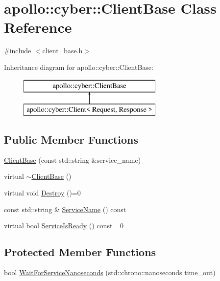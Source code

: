 \hypertarget{classapollo_1_1cyber_1_1ClientBase}{\section{apollo\-:\-:cyber\-:\-:Client\-Base Class Reference}
\label{classapollo_1_1cyber_1_1ClientBase}
}


{\ttfamily \#include $<$client\-\_\-base.\-h$>$}

Inheritance diagram for apollo\-:\-:cyber\-:\-:Client\-Base\-:\begin{figure}[H]
\begin{center}
\leavevmode
\includegraphics[height=2.000000cm]{classapollo_1_1cyber_1_1ClientBase}
\end{center}
\end{figure}
\subsection*{Public Member Functions}
\begin{DoxyCompactItemize}
\item 
\hyperlink{classapollo_1_1cyber_1_1ClientBase_a11ae882f14c81d424e6065e84e274032}{Client\-Base} (const std\-::string \&service\-\_\-name)
\item 
virtual \hyperlink{classapollo_1_1cyber_1_1ClientBase_a415c5d2ee0ef5bf9fd55c9536417c718}{$\sim$\-Client\-Base} ()
\item 
virtual void \hyperlink{classapollo_1_1cyber_1_1ClientBase_a144df36f1d8e9ec5923e3ad77a4ee634}{Destroy} ()=0
\item 
const std\-::string \& \hyperlink{classapollo_1_1cyber_1_1ClientBase_a9d29607d93d7d68ccc3b248ef6f9cf47}{Service\-Name} () const 
\item 
virtual bool \hyperlink{classapollo_1_1cyber_1_1ClientBase_af21c54a3f02783626ce5ae5eea621bda}{Service\-Is\-Ready} () const =0
\end{DoxyCompactItemize}
\subsection*{Protected Member Functions}
\begin{DoxyCompactItemize}
\item 
bool \hyperlink{classapollo_1_1cyber_1_1ClientBase_ad6c2d2b853720a17de21f3bc25b6aae9}{Wait\-For\-Service\-Nanoseconds} (std\-::chrono\-::nanoseconds time\-\_\-out)
\end{DoxyCompactItemize}
